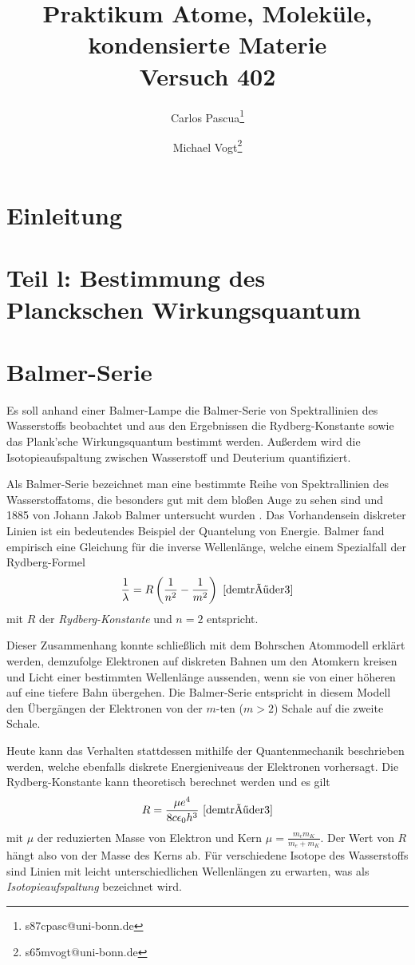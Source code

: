 \documentclass{article}
\title{Praktikum Atome, Moleküle, kondensierte Materie \\ Versuch 402}
\author[1]{Carlos Pascua\thanks{s87cpasc@uni-bonn.de}}
\author[1]{Michael Vogt\thanks{s65mvogt@uni-bonn.de}}
\affil[1]{Uni Bonn}
\begin{document}
\maketitle
\tableofcontents
\newpage
{}

\pagestyle{fancy}
\fancyhead[R]{\thepage}
\fancyhead[L]{\leftmark}

\section*{Einleitung}


\section{Teil l: Bestimmung des Planckschen Wirkungsquantum}

\section{Balmer-Serie}
Es soll anhand einer Balmer-Lampe die Balmer-Serie von Spektrallinien des Wasserstoffs beobachtet und aus den Ergebnissen
die Rydberg-Konstante sowie das Plank'sche Wirkungsquantum bestimmt werden. Außerdem wird die Isotopieaufspaltung zwischen Wasserstoff und Deuterium quantifiziert.

Als Balmer-Serie bezeichnet man eine bestimmte Reihe von Spektrallinien des Wasserstoffatoms, die besonders gut mit dem bloßen Auge zu sehen sind
und 1885 von Johann Jakob Balmer untersucht wurden \cite[S. 99]{demtröder3}. Das Vorhandensein diskreter Linien ist ein bedeutendes Beispiel der Quantelung von Energie.
Balmer fand empirisch eine Gleichung für die inverse Wellenlänge, welche einem Spezialfall der Rydberg-Formel
\begin{equation}
  \frac{1}{\lambda} = R \left(\frac{1}{n^2} - \frac{1}{m^2}\right)\ \cite{demtröder3} \label{eq:rydberg-formel}
\end{equation}
mit $R$ der \textit{Rydberg-Konstante} und $n=2$ entspricht.

Dieser Zusammenhang konnte schließlich mit dem Bohrschen Atommodell erklärt werden, demzufolge Elektronen auf diskreten Bahnen um den Atomkern kreisen
und Licht einer bestimmten Wellenlänge aussenden, wenn sie von einer höheren auf eine tiefere Bahn übergehen.
Die Balmer-Serie entspricht in diesem Modell den Übergängen der Elektronen von der $m$-ten ($m>2$) Schale auf die zweite Schale.

Heute kann das Verhalten stattdessen mithilfe der Quantenmechanik beschrieben werden, welche ebenfalls diskrete Energieniveaus der Elektronen vorhersagt.
Die Rydberg-Konstante kann theoretisch berechnet werden und es gilt
\begin{equation}
  R = \frac{\mu e^4}{8c\epsilon_0 h^3}~\cite[S.101]{demtröder3} \label{eq:rydberg-konstante} 
\end{equation}
mit $\mu$ der reduzierten Masse von Elektron und Kern $\mu = \frac{m_e m_K}{m_e+m_K}$.
Der Wert von $R$ hängt also von der Masse des Kerns ab. Für verschiedene Isotope des Wasserstoffs sind Linien mit leicht unterschiedlichen Wellenlängen
zu erwarten, was als \textit{Isotopieaufspaltung} bezeichnet wird.
\end{document}
